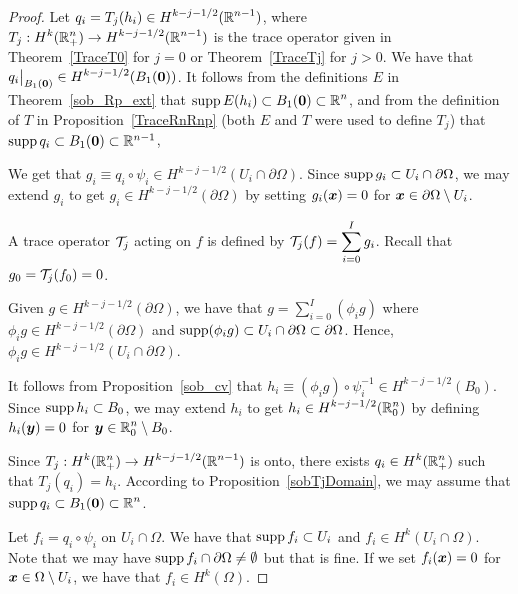 \begin{proof}
Let $\displaystyle q_i = T_j(h_i) \in H^{k-j-1/2}(\mathbb{R}^{n-1})$,
where $\displaystyle T_j:H^k(\mathbb{R}^n_+) \to H^{k-j-1/2}(\mathbb{R}^{n-1})$ is
the trace operator given in Theorem~\ref{TraceT0} for $j=0$ or
Theorem~\ref{TraceTj} for $j>0$.  We have that
$\displaystyle q_i\big|_{B_1({\bm{0}})} \in H^{k-j-1/2}(B_1({\bm{0}}))$.
It follows from the definitions $E$ in Theorem~\ref{sob_Rp_ext}
that $\displaystyle \operatorname{supp} E(h_i) \subset B_1({\bm{0}}) \subset \mathbb{R}^n$,
and from the definition of $T$ in Proposition~\ref{TraceRnRnp} (both
$E$ and $T$ were used to define $T_j$)
that $\operatorname{supp} q_i \subset B_1({\bm{0}}) \subset \mathbb{R}^{n-1}$,

We get that
$\displaystyle g_i \equiv q_i \circ \psi_i \in
H^{k-j-1/2}(U_i \cap \partial \Omega)$.
Since $\operatorname{supp} g_i \subset U_i \cap \partial \Omega$, we
may extend $g_i$ to get
$\displaystyle g_i \in H^{k-j-1/2}(\partial \Omega)$ by setting
$g_i({\bm{x}}) = 0$ for ${\bm{x}} \in \partial \Omega \setminus U_i$.

A trace operator $\mathcal{T}_j$ acting on $f$ is defined by
$\displaystyle \mathcal{T}_j(f) = \sum_{i=0}^I g_i$.
Recall that $g_0 = \mathcal{T}_j(f_0) = 0$.

Given $\displaystyle g \in H^{k-j-1/2}(\partial \Omega)$, we have that
$\displaystyle g = \sum_{i=0}^I (\phi_i g)$ where
$\displaystyle \phi_i g \in H^{k-j-1/2}(\partial \Omega)$ and
$\operatorname{supp} (\phi_i g) \subset U_i \cap \partial \Omega \subset \partial \Omega$.
Hence,
$\displaystyle \phi_i g \in H^{k-j-1/2}(U_i \cap \partial \Omega)$.

It follows from Proposition~\ref{sob_cv} that
$\displaystyle h_i \equiv (\phi_i g) \circ \psi_i^{-1} \in H^{k-j-1/2}(B_0)$.
Since $\displaystyle \operatorname{supp} h_i \subset B_0$, we may extend
$h_i$ to get $h_i \in \displaystyle H^{k-j-1/2}(\mathbb{R}^n_0)$ by defining
$\displaystyle h_i({\bm{y}}) = 0$ for
$\displaystyle {\bm{y}} \in \mathbb{R}^n_0 \setminus B_0$.

Since $\displaystyle T_j: H^k(\mathbb{R}^n_+) \to H^{k-j-1/2}(\mathbb{R}^{n-1})$ is onto, there
exists $\displaystyle q_i \in H^k(\mathbb{R}^n_+)$ such that 
$\displaystyle T_j (q_i) = h_i$.  According to
Proposition~\ref{sobTjDomain}, we may assume that
$\displaystyle \operatorname{supp} q_i \subset B_1({\bm{0}}) \subset \mathbb{R}^n$.

Let $f_i = q_i \circ \psi_i$ on $U_i\cap \Omega$.  We have that
$\operatorname{supp} f_i \subset U_i$ and $\displaystyle f_i \in H^k(U_i\cap \Omega)$.
Note that we may have
$\operatorname{supp} f_i \cap \partial \Omega \neq \emptyset$ but that is fine.
If we set $f_i({\bm{x}}) = 0$ for
${\bm{x}} \in \Omega \setminus U_i$, we have that
$\displaystyle f_i \in H^k(\Omega)$.


\end{proof}
